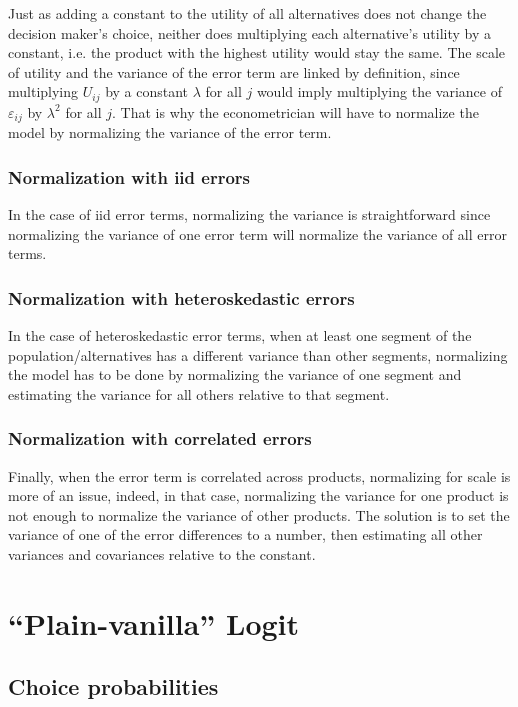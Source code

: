 Just as adding a constant to the utility of all alternatives does
not change the decision maker’s choice, neither does multiplying each
alternative’s utility by a constant, i.e. the product with the highest utility would stay the same. The scale of utility and the variance of the error term are linked by definition, since multiplying $U_{ij}$ by a constant $\lambda$ for all $j$ would imply multiplying the variance of $\varepsilon_{ij}$ by $\lambda^2$ for all $j$. That is why the econometrician will have to normalize the model by normalizing the variance of the error term.

\subsubsection{Normalization with iid errors}

In the case of iid error terms, normalizing the variance is straightforward since normalizing the variance of one error term will normalize the variance of all error terms.

\subsubsection{Normalization with heteroskedastic errors}

In the case of heteroskedastic error terms, when at least one segment of the population/alternatives has a different variance than other segments, normalizing the model has to be done by normalizing the variance of one segment and estimating the variance for all others relative to that segment.

\subsubsection{Normalization with correlated errors}

Finally, when the error term is correlated across products, normalizing for scale is more of an issue, indeed, in that case, normalizing the variance for one product is not enough to normalize the variance of other products. The solution is to set the variance of one of the error differences to a number, then estimating all other variances and covariances relative to the constant.

\section{``Plain-vanilla'' Logit}

\subsection{Choice probabilities}

